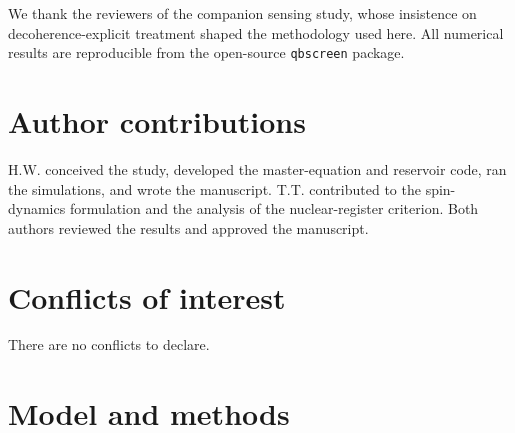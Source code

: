 \documentclass[aps,prx,reprint,superscriptaddress,nofootinbib,floatfix]{revtex4-2}
\begin{document}
\begin{acknowledgments}
We thank the reviewers of the companion sensing study, whose insistence on
decoherence-explicit treatment shaped the methodology used here. All numerical
results are reproducible from the open-source \texttt{qbscreen} package.
\end{acknowledgments}

\section*{Author contributions}
H.W. conceived the study, developed the master-equation and reservoir code, ran the
simulations, and wrote the manuscript. T.T. contributed to the spin-dynamics
formulation and the analysis of the nuclear-register criterion. Both authors
reviewed the results and approved the manuscript.

\section*{Conflicts of interest}
There are no conflicts to declare.

\appendix

\section{Model and methods}
\label{app:methods}
\end{document}
